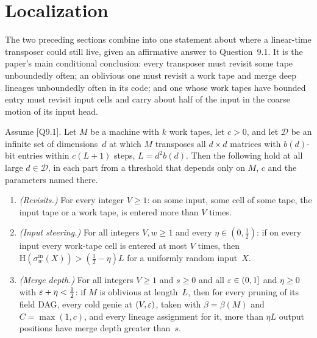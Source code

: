 \section{Localization}\label{sec:localization}

The two preceding sections combine into one statement about where a linear-time transposer could still live, given an
affirmative answer to Question~9.1. It is the paper's main conditional conclusion: every transposer must revisit some
tape unboundedly often; an oblivious one must revisit a work tape and merge deep lineages unboundedly often in its code;
and one whose work tapes have bounded entry must revisit input cells and carry about half of the input in the coarse
motion of its input head.

\begin{theorem}\label{thm:L}
Assume [Q9.1]. Let $M$ be a machine with $k$ work tapes, let $c>0$, and let $\mathcal D$ be an infinite set of
dimensions~$d$ at which $M$ transposes all $d\times d$ matrices with $b(d)$-bit entries within $c(L+1)$ steps,
$L=d^2b(d)$. Then the following hold at all large $d\in\mathcal D$, in each part from a threshold that depends only on
$M$, $c$ and the parameters named there.
\begin{enumerate}[label=(\alph*)]
\item \emph{(Revisits.)} For every integer $V\ge1$: on some input, some cell of some tape, the input tape or a work tape,
is entered more than $V$ times.
\item \emph{(Input steering.)} For all integers $V,w\ge1$ and every $\eta\in(0,\frac12)$: if on every input every
work-tape cell is entered at most $V$ times, then $\mathrm H(\sigma^{\mathrm{in}}_w(X))>(\frac12-\eta)L$ for a uniformly
random input~$X$.
\item \emph{(Merge depth.)} For all integers $V\ge1$ and $s\ge0$ and all $\varepsilon\in(0,1]$ and $\eta\ge0$ with
$\varepsilon+\eta<\frac12$: if $M$ is oblivious at length~$L$, then for every pruning of its field DAG, every cold genie at
$(V,\varepsilon)$, taken with $\beta=\beta(M)$ and $C=\max(1,c)$, and every lineage assignment for it, more than $\eta L$ output
positions have merge depth greater than~$s$.
\end{enumerate}
\end{theorem}

